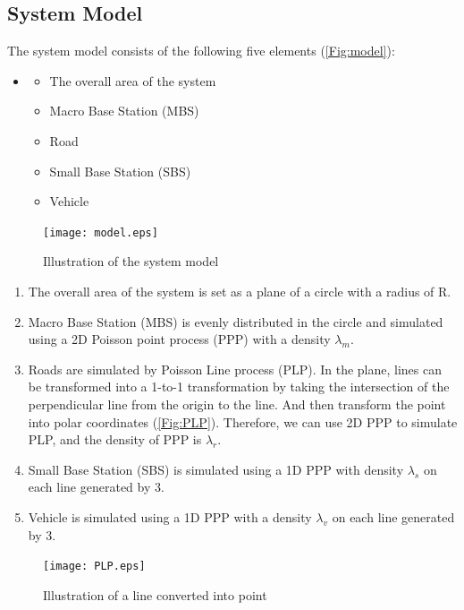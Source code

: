 \documentclass[conference]{IEEEtran}
\begin{document}
\begin{CJK*}{UTF8}{bsmi}
\section{System Model}
The system model consists of the following five elements (\autoref{Fig:model}): 
\begin{itemize}
    \item[]
    \begin{itemize}
        \item The overall area of the system 
        \item Macro Base Station (MBS)
        \item Road 
        \item Small Base Station (SBS) 
        \item Vehicle
    \end{itemize}
\end{itemize}

\begin{figure}[htbp]
\centering
\texttt{[image: model.eps]}
\caption{\label{Fig:model}Illustration of the system model}
\end{figure}

\begin{enumerate}
    \item The overall area of the system is set as a plane of a circle with a radius of R.
    \item Macro Base Station (MBS) is evenly distributed in the circle and simulated using a 2D Poisson point process (PPP) with a density $\lambda_m$.
    \\
    \item Roads are simulated by Poisson Line process (PLP). In the plane, lines can be transformed into a 1-to-1 transformation by taking the intersection of the perpendicular line from the origin to the line. And then transform the point into polar coordinates (\autoref{Fig:PLP}). Therefore, we can use 2D PPP to simulate PLP, and the density of PPP is  $\lambda_r$.
    \\
    \item Small Base Station (SBS) is simulated using a 1D PPP with density $\lambda_s$ on each line generated by 3.
    \\
    \item Vehicle is simulated using a 1D PPP with a density $\lambda_v$ on each line generated by 3.
\end{enumerate}

\begin{figure}[htbp]
\centering
\texttt{[image: PLP.eps]}
\caption{\label{Fig:PLP}Illustration of a line converted into point\cite{b2}}
\end{figure}


\end{CJK*}
\end{document}
